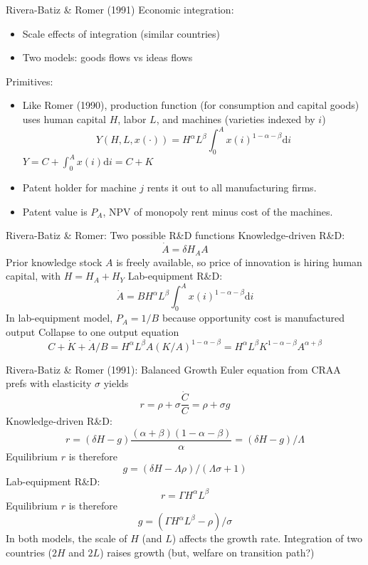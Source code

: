 \documentclass[10pt,notes=hide]{beamer}
\begin{document}
\begin{frame}{Rivera-Batiz \& Romer (1991)}
Economic integration:
\begin{itemize}
\item Scale effects of integration (similar countries)
\item Two models: goods flows vs ideas flows
\end{itemize}
Primitives:
\begin{itemize}
\item
Like Romer (1990),
production function (for consumption and capital goods) uses human capital $H$, labor $L$, and machines (varieties indexed by $i$)
$$Y(H,L,x(\cdot)) = H^{\alpha} L^{\beta} \int_{0}^{A} x(i)^{1-\alpha-\beta} \textrm{d} i$$
$Y=C+\int_{0}^{A}x(i)\textrm{d}i = C + K$
\item
Patent holder for machine $j$ rents it out to all manufacturing firms.
\item
Patent value is $P_A$, NPV of monopoly rent minus cost of the machines.
\end{itemize}
\end{frame}
\begin{frame}{Rivera-Batiz \& Romer: Two possible R\&D functions}
Knowledge-driven R\&D: $$\dot{A} = \delta H_A A$$
Prior knowledge stock $A$ is freely available, so price of innovation is hiring human capital,
with $H = H_A + H_Y$
Lab-equipment R\&D: $$\dot{A} = B H^{\alpha} L^{\beta} \int_{0}^{A} x(i)^{1-\alpha-\beta} \textrm{d} i$$
In lab-equipment model, $P_A = 1/B$ because opportunity cost is manufactured output
Collapse to one output equation
$$
C + \dot{K} + \dot{A}/B = H^{\alpha}L^{\beta}A(K/A)^{1-\alpha-\beta} = H^{\alpha}L^{\beta}K^{1-\alpha-\beta}A^{\alpha+\beta}
$$
\end{frame}
\begin{frame}{Rivera-Batiz \& Romer (1991): Balanced Growth}
Euler equation from CRAA prefs with elasticity $\sigma$ yields
$$r = \rho + \sigma \frac{\dot{C}}{C} = \rho + \sigma g$$
Knowledge-driven R\&D:
$$r = \left(\delta H - g\right) \frac{(\alpha+\beta)(1-\alpha-\beta)}{\alpha} = \left(\delta H - g \right) /\Lambda$$
Equilibrium $r$ is therefore
$$g = \left(\delta H - \Lambda \rho\right)/\left(\Lambda\sigma+1\right)$$
Lab-equipment R\&D:
$$r=\Gamma H^{\alpha}L^{\beta}$$
Equilibrium $r$ is therefore
$$g = \left(\Gamma H^{\alpha}L^{\beta} - \rho\right)/\sigma$$
In both models, the scale of $H$ (and $L$) affects the growth rate.
Integration of two countries ($2H$ and $2L$) raises growth (but, welfare on transition path?)
\end{frame}
\end{document}
